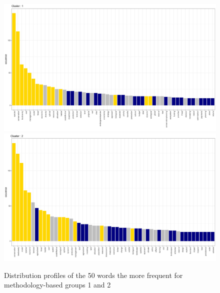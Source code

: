 \begin{figure}[h]
\centering
\includegraphics[width = .8\textwidth]{figures/review/occurence_kmodes_new_1_n50_common.png}\\
\includegraphics[width = .8\textwidth]{figures/review/occurence_kmodes_new_2_n50_common.png}
\caption{ Distribution profiles of the 50 words the more frequent for methodology-based groups 1 and 2}
\label{fig:words-profile-1}
\end{figure}

